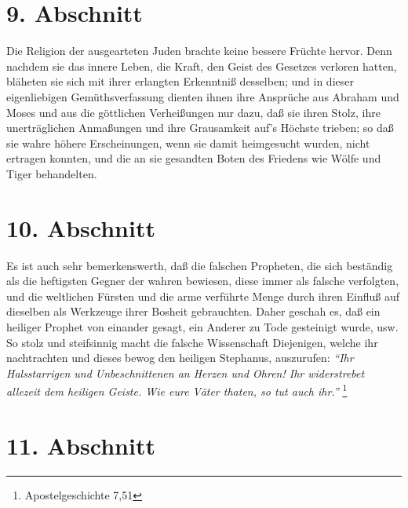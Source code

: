 \section{9. Abschnitt} \label{kap7_ab9}

Die Religion der ausgearteten Juden brachte keine bessere Früchte hervor. Denn
nachdem sie das innere Leben, die Kraft, den Geist des Gesetzes verloren hatten,
bläheten sie sich mit ihrer erlangten Erkenntniß desselben; und in dieser
eigenliebigen Gemüthsverfassung dienten ihnen ihre Ansprüche aus Abraham und
Moses und aus die göttlichen Verheißungen nur dazu, daß sie ihren Stolz, ihre
unerträglichen Anmaßungen und ihre Grausamkeit auf's Höchste trieben; so daß sie
wahre höhere Erscheinungen, wenn sie damit heimgesucht wurden, nicht ertragen
konnten, und die an sie gesandten Boten des Friedens wie Wölfe und Tiger
behandelten.

\section{10. Abschnitt} \label{kap7_ab10}

Es ist auch sehr bemerkenswerth, daß die falschen Propheten, die sich beständig
als die heftigsten Gegner der wahren bewiesen, diese immer als falsche
verfolgten, und die weltlichen Fürsten und die arme verführte Menge durch ihren
Einfluß auf dieselben als Werkzeuge ihrer Bosheit gebrauchten. Daher geschah es,
daß ein heiliger Prophet von einander gesagt, ein Anderer zu Tode gesteinigt
wurde, usw. So stolz und steifsinnig macht die falsche Wissenschaft
Diejenigen, welche ihr nachtrachten und dieses bewog den heiligen  Stephanus,
auszurufen:
\textit{"`Ihr Halsstarrigen und Unbeschnittenen an Herzen und Ohren! Ihr widerstrebet allezeit dem heiligen Geiste. Wie eure Väter thaten, so tut auch ihr."'}
\footnote{Apostelgeschichte 7,51}

\section{11. Abschnitt} \label{kap7_ab11}

